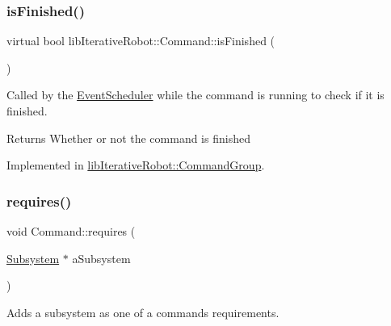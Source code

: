 \mbox{\label{classlib_iterative_robot_1_1_command_a8e4dccdd88f432a716090f532ba097f7}} 
\subsubsection{\texorpdfstring{isFinished()}{isFinished()}}
{\footnotesize\ttfamily virtual bool lib\+Iterative\+Robot\+::\+Command\+::is\+Finished (\begin{DoxyParamCaption}{ }\end{DoxyParamCaption})\hspace{0.3cm}{\ttfamily [pure virtual]}}



Called by the \mbox{\hyperlink{classlib_iterative_robot_1_1_event_scheduler}{Event\+Scheduler}} while the command is running to check if it is finished. 

\begin{DoxyReturn}{Returns}
Whether or not the command is finished 
\end{DoxyReturn}


Implemented in \mbox{\hyperlink{classlib_iterative_robot_1_1_command_group_a96807a2763adf9e21ebf2cb9e3574e3c}{lib\+Iterative\+Robot\+::\+Command\+Group}}.

\mbox{\label{classlib_iterative_robot_1_1_command_ad7b7f328974f5f17a2a4b1593b6c9eb5}} 
\subsubsection{\texorpdfstring{requires()}{requires()}}
{\footnotesize\ttfamily void Command\+::requires (\begin{DoxyParamCaption}\item[{\mbox{\hyperlink{classlib_iterative_robot_1_1_subsystem}{Subsystem}} $\ast$}]{a\+Subsystem }\end{DoxyParamCaption})\hspace{0.3cm}{\ttfamily [protected]}}



Adds a subsystem as one of a command\textquotesingle{}s requirements. 


